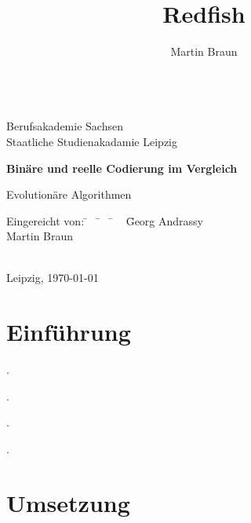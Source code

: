 \documentclass[12pt,
    a4paper,
    headinclude,
    footinclude]{scrreprt}
\author{Martin Braun}
\title{Redfish}
\begin{document}
	\onehalfspacing
	\monthyearsepgerman{\,}{\,}
	\setcounter{tocdepth}{2}
	

	
	\begin{titlepage}
	
		\begin{center}
			~\\[2cm]
			Berufsakademie Sachsen \\
			Staatliche Studienakadamie Leipzig \\[2.4cm]
           
			\begin{huge}
			    \textbf{Binäre und reelle Codierung im Vergleich} \\[2.4cm]
			\end{huge}
			
			\doublespacing

			Evolutionäre Algorithmen 


		\end{center}
		
		\onehalfspacing
		\begin{tabbing}
			Eingereicht von: \= ~ \= ~ \= ~ \= Georg Andrassy \\
			\> \> \> \> Martin Braun \\
			\\

		\end{tabbing}
		\vspace*{\fill}
		Leipzig, \today
		
	\end{titlepage}
    
    \clearpage
        
    \setcounter{page}{2}
    
\section*{Einführung}	\onehalfspacing
	
.

.

.

.


	
	
\section*{Umsetzung}
\end{document}
